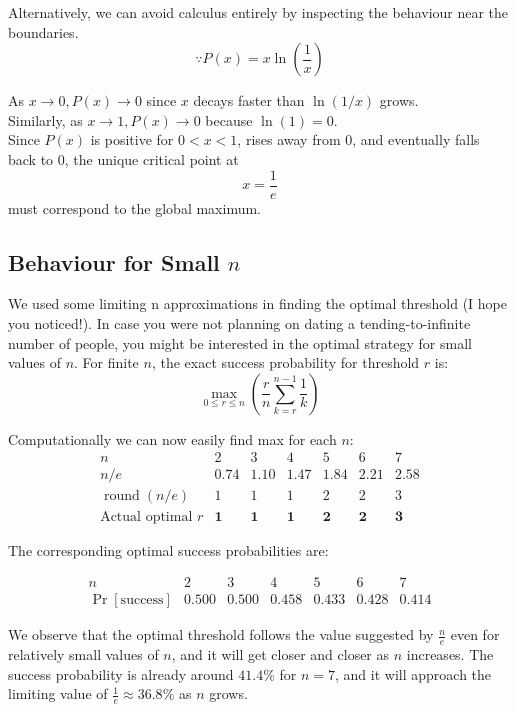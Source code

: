 \documentclass[11pt,openany]{book}
\begin{document}
\noindent Alternatively, we can avoid calculus entirely by inspecting the behaviour near the boundaries. 
\[
\because P(x)=x\ln\left(\frac1x\right)
\]

As $x \to 0,P(x) \to 0$ since \(x\) decays faster than \(\ln(1/x)\) grows. \\


\noindent Similarly, as $x \to 1,P(x) \to 0$ because $\ln(1)=0$.\\


\noindent Since \(P(x)\) is positive for \(0<x<1\), rises away from \(0\), and eventually 
falls back to \(0\), the unique critical point at
\[
x=\frac1e
\]
must correspond to the global maximum.

\subsection*{Behaviour for Small \(n\)}

We used some limiting n approximations in finding the optimal threshold (I hope you noticed!).
In case you were not planning on dating a tending-to-infinite number of people, you might be interested in the optimal strategy for small values of \(n\).
For finite \(n\), the exact success probability for threshold \(r\) is:
\[
\max_{0\le r\le n} \left(\frac{r}{n}\sum_{k=r}^{n-1}\frac1k\right)
\]

Computationally we can now easily find max for each \(n\):
\[
\begin{array}{c|cccccc}
n & 2 & 3 & 4 & 5 & 6 & 7\\
\hline
n/e
& 0.74
& 1.10
& 1.47
& 1.84
& 2.21
& 2.58
\\
\hline
\operatorname{round}(n/e)
& 1
& 1
& 1
& 2
& 2
& 3
\\
\hline
\text{Actual optimal }r
& \mathbf{1}
& \mathbf{1}
& \mathbf{1}
& \mathbf{2}
& \mathbf{2}
& \mathbf{3}
\end{array}
\]

\vspace{1em}

The corresponding optimal success probabilities are:

\[
\begin{array}{c|cccccc}
n & 2 & 3 & 4 & 5 & 6 & 7\\
\hline
\Pr[\text{success}]
&
\mathbf{0.500}
&
\mathbf{0.500}
&
\mathbf{0.458}
&
\mathbf{0.433}
&
\mathbf{0.428}
&
\mathbf{0.414}
\end{array}
\]

We observe that the optimal threshold follows the value suggested by
$\frac{n}{e}$ even for relatively small values of \(n\), and it will get closer and closer as \(n\) increases. 
The success probability is already around \(41.4\%\) for \(n=7\), and it will approach the limiting value of \(\frac{1}{e}\approx 36.8\%\) as \(n\) grows.
\end{document}
